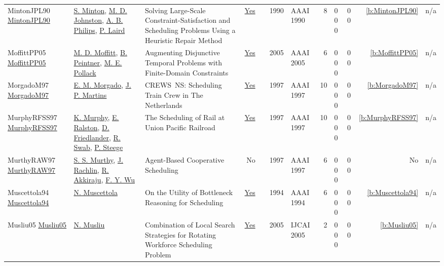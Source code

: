 {\begin{longtable}{>{\raggedright\arraybackslash}p{3cm}>{\raggedright\arraybackslash}p{4.5cm}>{\raggedright\arraybackslash}p{6.0cm}rrrp{2.5cm}rp{1cm}p{1cm}rr}
MintonJPL90 \href{http://www.aaai.org/Library/AAAI/1990/aaai90-003.php}{MintonJPL90} & \hyperref[auth:a1211]{S. Minton}, \hyperref[auth:a1212]{M. D. Johnston}, \hyperref[auth:a1213]{A. B. Philips}, \hyperref[auth:a1214]{P. Laird} & Solving Large-Scale Constraint-Satisfaction and Scheduling Problems Using a Heuristic Repair Method & \href{../works/MintonJPL90.pdf}{Yes} & \cite{MintonJPL90} & 1990 & AAAI 1990 & 8 & 0 0 0 & 0 0 & \ref{b:MintonJPL90} & n/a\\
MoffittPP05 \href{http://www.aaai.org/Library/AAAI/2005/aaai05-188.php}{MoffittPP05} & \hyperref[auth:a771]{M. D. Moffitt}, \hyperref[auth:a772]{B. Peintner}, \hyperref[auth:a773]{M. E. Pollack} & Augmenting Disjunctive Temporal Problems with Finite-Domain Constraints & \href{../works/MoffittPP05.pdf}{Yes} & \cite{MoffittPP05} & 2005 & AAAI 2005 & 6 & 0 0 0 & 0 0 & \ref{b:MoffittPP05} & n/a\\
MorgadoM97 \href{http://www.aaai.org/Library/IAAI/1997/iaai97-186.php}{MorgadoM97} & \hyperref[auth:a1296]{E. M. Morgado}, \hyperref[auth:a1297]{J. P. Martins} & CREWS{\ }NS: Scheduling Train Crew in The Netherlands & \href{../works/MorgadoM97.pdf}{Yes} & \cite{MorgadoM97} & 1997 & AAAI 1997 & 10 & 0 0 0 & 0 0 & \ref{b:MorgadoM97} & n/a\\
MurphyRFSS97 \href{http://www.aaai.org/Library/IAAI/1997/iaai97-187.php}{MurphyRFSS97} & \hyperref[auth:a1298]{K. Murphy}, \hyperref[auth:a1299]{E. Ralston}, \hyperref[auth:a1300]{D. Friedlander}, \hyperref[auth:a1301]{R. Swab}, \hyperref[auth:a1302]{P. Steege} & The Scheduling of Rail at Union Pacific Railroad & \href{../works/MurphyRFSS97.pdf}{Yes} & \cite{MurphyRFSS97} & 1997 & AAAI 1997 & 10 & 0 0 0 & 0 0 & \ref{b:MurphyRFSS97} & n/a\\
MurthyRAW97 \href{}{MurthyRAW97} & \hyperref[auth:a1311]{S. S. Murthy}, \hyperref[auth:a1312]{J. Rachlin}, \hyperref[auth:a1313]{R. Akkiraju}, \hyperref[auth:a1314]{F. Y. Wu} & Agent-Based Cooperative Scheduling & No & \cite{MurthyRAW97} & 1997 & AAAI 1997 & 6 & 0 0 0 & 0 0 & No & n/a\\
Muscettola94 \href{http://www.aaai.org/Library/AAAI/1994/aaai94-170.php}{Muscettola94} & \hyperref[auth:a289]{N. Muscettola} & On the Utility of Bottleneck Reasoning for Scheduling & \href{../works/Muscettola94.pdf}{Yes} & \cite{Muscettola94} & 1994 & AAAI 1994 & 6 & 0 0 0 & 0 0 & \ref{b:Muscettola94} & n/a\\
Musliu05 \href{http://ijcai.org/Proceedings/05/Papers/post-0448.pdf}{Musliu05} & \hyperref[auth:a45]{N. Musliu} & Combination of Local Search Strategies for Rotating Workforce Scheduling Problem & \href{../works/Musliu05.pdf}{Yes} & \cite{Musliu05} & 2005 & IJCAI 2005 & 2 & 0 0 0 & 0 0 & \ref{b:Musliu05} & n/a\\

\end{longtable}}
